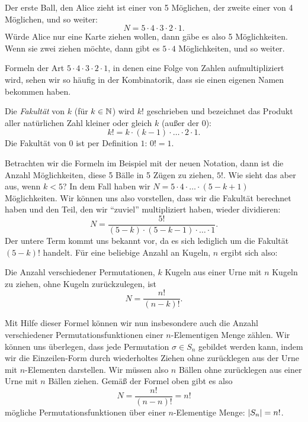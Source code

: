 \documentclass[../../main.tex]{subfiles}
\begin{document}
\begin{example}
        Der erste Ball, den Alice zieht ist einer von 5 Möglichen, der zweite einer von 4 Möglichen, und so weiter:
        $$N = 5\cdot 4 \cdot 3 \cdot 2 \cdot 1.$$
        Würde Alice nur eine Karte ziehen wollen, dann gäbe es also 5 Möglichkeiten. Wenn sie zwei ziehen möchte, dann gibt es $5\cdot 4$ Möglichkeiten, und so weiter.
    \end{example}
    
    Formeln der Art $5\cdot 4\cdot 3\cdot 2\cdot 1$, in denen eine Folge von Zahlen aufmultipliziert wird, sehen wir so häufig in der Kombinatorik, dass sie einen eigenen Namen bekommen haben.
    
    \begin{definition}
        Die \emph{Fakultät} von $k$ (für $k\in\mathbb{N}$) wird $k!$ geschrieben und bezeichnet das Produkt aller natürlichen Zahl kleiner oder gleich $k$ (außer der 0):
        $$k! = k\cdot (k-1) \cdot \ldots \cdot 2 \cdot 1.$$
        Die Fakultät von $0$ ist per Definition $1$: $0! = 1$.
    \end{definition}
    
    Betrachten wir die Formeln im Beispiel mit der neuen Notation, dann ist die Anzahl Möglichkeiten, diese 5 Bälle in 5 Zügen zu ziehen, $5!$. Wie sieht das aber aus, wenn $k < 5$? In dem Fall haben wir $N = 5\cdot 4 \cdot \ldots \cdot (5-k+1)$ Möglichkeiten. Wir können uns also vorstellen, dass wir die Fakultät berechnet haben und den Teil, den wir \enquote{zuviel} multipliziert haben, wieder dividieren:
    $$N = \frac{5!}{(5-k) \cdot (5-k-1) \cdot \ldots \cdot 1}.$$
    Der untere Term kommt uns bekannt vor, da es sich lediglich um die Fakultät $(5-k)!$ handelt. Für eine beliebige Anzahl an Kugeln, $n$ ergibt sich also:
    \begin{lemma}
        Die Anzahl verschiedener Permutationen, $k$ Kugeln aus einer Urne mit $n$ Kugeln zu ziehen, ohne Kugeln zurückzulegen, ist $$N = \frac{n!}{(n-k)!}.$$
    \end{lemma}
    
    Mit Hilfe dieser Formel können wir nun insbesondere auch die Anzahl verschiedener Permutationsfunktionen einer $n$-Elementigen Menge zählen. Wir können uns überlegen, dass jede Permutation $\sigma \in S_n$ gebildet werden kann, indem wir die Einzeilen-Form durch wiederholtes Ziehen ohne zurücklegen aus der Urne mit $n$-Elementen darstellen. Wir müssen also $n$ Bällen ohne zurücklegen aus einer Urne mit $n$ Bällen ziehen. Gemäß der Formel oben gibt es also
    $$N = \frac{n!}{(n-n)!} = n!$$
    mögliche Permutationsfunktionen über einer $n$-Elementige Menge: $\lvert S_n\rvert = n!$.
    
\end{document}
